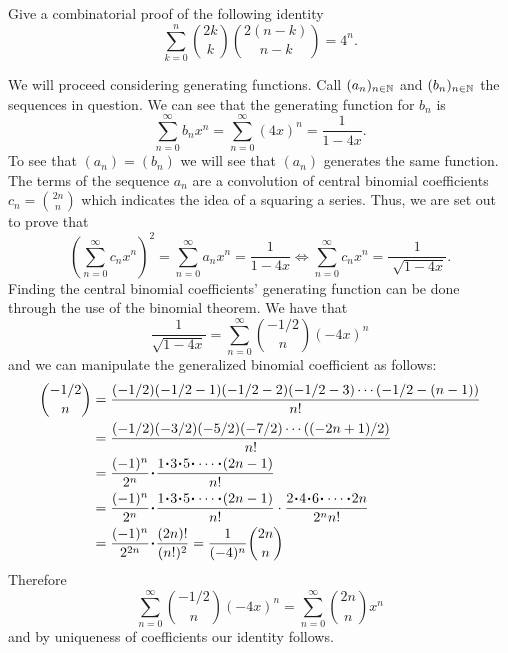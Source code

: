 \documentclass[12pt]{memoir}
\begin{document}
\begin{Ej}
    Give a combinatorial proof of the following identity
    $$\sum_{k=0}^n\binom{2k}{k}\binom{2(n-k)}{n-k}=4^n.$$
\end{Ej}

\begin{ptcbr}
    We will proceed considering generating functions. Call $(a_n)_{n\in\mathbb{N}}$ and $(b_n)_{n\in\mathbb{N}}$ the sequences in question. We can see that the generating function for $b_n$ is 
    $$\sum_{n=0}^\infty b_nx^n=\sum_{n=0}^\infty (4x)^n=\frac{1}{1-4x}.$$
    To see that $(a_n)=(b_n)$ we will see that $(a_n)$ generates the same function. The terms of the sequence $a_n$ are a convolution of central binomial coefficients $c_n=\binom{2n}{n}$ which indicates the idea of a squaring a series. Thus, we are set out to prove that
    $$\left(\sum_{n=0}^\infty c_nx^n\right)^2=\sum_{n=0}^\infty a_nx^n=\frac{1}{1-4x}\iff \sum_{n=0}^\infty c_nx^n=\frac{1}{\sqrt[]{1-4x}}.$$
    Finding the central binomial coefficients' generating function can be done through the use of the binomial theorem. We have that 
    $$\frac{1}{\sqrt{1-4x}}=\sum_{n=0}^\infty\binom{-1/2}{n}(-4x)^n$$
    and we can manipulate the generalized binomial coefficient as follows:
    \begin{align*}
        \binom{-1/2}{n}&=\frac{(-1/2)(-1/2-1)(-1/2-2)(-1/2-3)\cdots(-1/2-(n-1))}{n!}\\
        &=\frac{(-1/2)(-3/2)(-5/2)(-7/2)\cdots((-2n+1)/2)}{n!}\\
        &=\frac{(-1)^n}{2^n}\.\frac{1\.3\.5\.\cdots\.(2n-1)}{n!}\\
        &=\frac{(-1)^n}{2^n}\.\frac{1\.3\.5\.\cdots\.(2n-1)}{n!}\cdot\frac{2\.4\.6\.\cdots\.2n}{2^nn!}\\
&=\frac{(-1)^n}{2^{2n}}\.\frac{(2n)!}{(n!)^2}=\frac{1}{(-4)^n}\binom{2n}{n}
    \end{align*}
    Therefore 
    $$\sum_{n=0}^\infty\binom{-1/2}{n}(-4x)^n=\sum_{n=0}^\infty\binom{2n}{n}x^n$$
    and by uniqueness of coefficients our identity follows.
\end{ptcbr}
\end{document}
